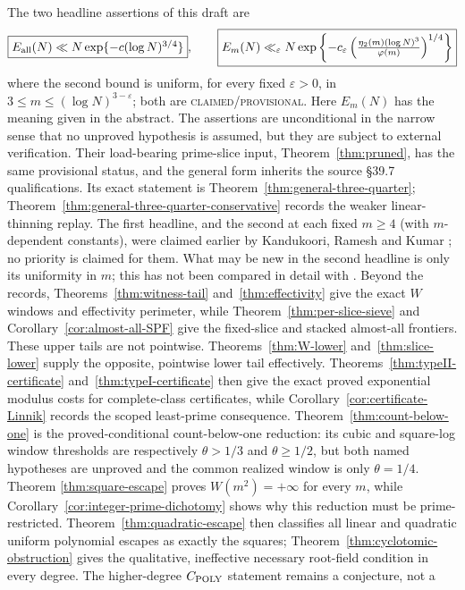 \documentclass[10pt,reqno]{amsart}
\theoremstyle{definition}
\newcommand{\1}{\mathbf 1}
\newcommand{\eps}{\varepsilon}
\begin{document}
The two headline assertions of this draft are
\[
 \boxed{\textstyle E_{\rm all}(N)\ll N\exp\{-c(\log N)^{3/4}\}},
 \qquad
 \boxed{\textstyle E_m(N)\ll_\eps N\exp\left\{-c_\eps
 \left(\frac{\eta_2(m)(\log N)^3}{\varphi(m)}\right)^{1/4}\right\}}
\]
where the second bound is uniform, for every fixed $\eps>0$, in
$3\leq m\leq(\log N)^{3-\eps}$; both are
\textsc{claimed/provisional}.  Here $E_m(N)$ has the meaning given in the
abstract.  The assertions are unconditional in the narrow sense that no
unproved hypothesis is assumed, but they are subject to external
verification.  Their load-bearing prime-slice input,
Theorem~\ref{thm:pruned}, has the same provisional status, and the general
form inherits the source \S39.7 qualifications.  Its exact statement is
Theorem~\ref{thm:general-three-quarter};
Theorem~\ref{thm:general-three-quarter-conservative} records the weaker
linear-thinning replay.  The first headline, and the second at each fixed
$m\geq4$ (with $m$-dependent constants), were claimed earlier by
Kandukoori, Ramesh and Kumar \cite[Thms.~1--2]{KRK}; no priority is
claimed for them.  What may be new in the second headline is only its
uniformity in $m$; this has not been compared in detail with \cite{KRK}.  Beyond the records, Theorems~\ref{thm:witness-tail}
and~\ref{thm:effectivity} give the exact $W$ windows and effectivity
perimeter, while Theorem~\ref{thm:per-slice-sieve} and
Corollary~\ref{cor:almost-all-SPF} give the fixed-slice and stacked
almost-all frontiers.  These upper tails are not pointwise.
Theorems~\ref{thm:W-lower} and~\ref{thm:slice-lower} supply the opposite,
pointwise lower tail effectively.  Theorems~\ref{thm:typeII-certificate}
and~\ref{thm:typeI-certificate} then give the exact proved exponential
modulus costs for complete-class certificates, while
Corollary~\ref{cor:certificate-Linnik} records the scoped least-prime
consequence.  Theorem~\ref{thm:count-below-one} is the proved-conditional
count-below-one reduction: its cubic and square-log window thresholds are
respectively $\theta>1/3$ and $\theta\geq1/2$, but both named hypotheses are
unproved and the common realized window is only $\theta=1/4$.  Theorem
\ref{thm:square-escape} proves $W(m^2)=+\infty$ for every $m$, while
Corollary~\ref{cor:integer-prime-dichotomy} shows why this reduction must be
prime-restricted.  Theorem~\ref{thm:quadratic-escape} then classifies all
linear and quadratic uniform polynomial escapes as exactly the squares;
Theorem~\ref{thm:cyclotomic-obstruction} gives the qualitative, ineffective
necessary root-field condition in every degree.  The higher-degree $C_{\rm POLY}$ statement remains a conjecture, not a
\end{document}
